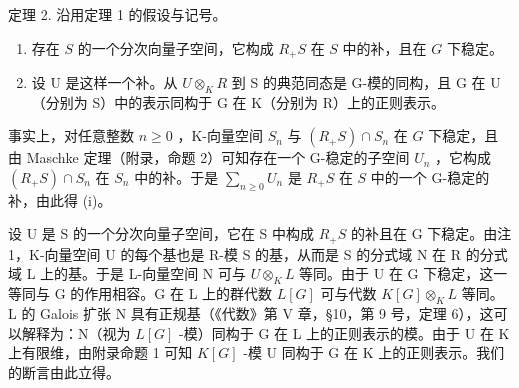 定理 2. 沿用定理 1 的假设与记号。

\begin{enumerate}
\def\labelenumi{(\roman{enumi})}
\item
  存在 \(S\) 的一个分次向量子空间，它构成 \(R_{+}S\) 在 \(S\) 中的补，且在 \(G\) 下稳定。
\item
  设 U 是这样一个补。从 \(U \otimes_{K} R\) 到 S 的典范同态是 G-模的同构，且 G 在 U（分别为 S）中的表示同构于 G 在 K（分别为 R）上的正则表示。
\end{enumerate}

事实上，对任意整数 \(n \geqslant 0\) ，K-向量空间 \(S_n\) 与 \((R_+S) \cap S_n\) 在 \(G\) 下稳定，且由 Maschke 定理（附录，命题 2）可知存在一个 G-稳定的子空间 \(U_n\) ，它构成 \((R_+S) \cap S_n\) 在 \(S_n\) 中的补。于是 \(\sum_{n \geqslant 0} U_n\) 是 \(R_+S\) 在 \(S\) 中的一个 G-稳定的补，由此得 (i)。

设 U 是 S 的一个分次向量子空间，它在 S 中构成 \(R_{+}S\) 的补且在 G 下稳定。由注 1，K-向量空间 U 的每个基也是 R-模 S 的基，从而是 S 的分式域 N 在 R 的分式域 L 上的基。于是 L-向量空间 N 可与 \(U \otimes_{K} L\) 等同。由于 U 在 G 下稳定，这一等同与 G 的作用相容。G 在 L 上的群代数 \(L[G]\) 可与代数 \(K[G] \otimes_{K} L\) 等同。L 的 Galois 扩张 N 具有正规基（《代数》第 V 章，§10，第 9 号，定理 6），这可以解释为：N（视为 \(L[G]\) -模）同构于 G 在 L 上的正则表示的模。由于 U 在 K 上有限维，由附录命题 1 可知 \(K[G]\) -模 U 同构于 G 在 K 上的正则表示。我们的断言由此立得。

